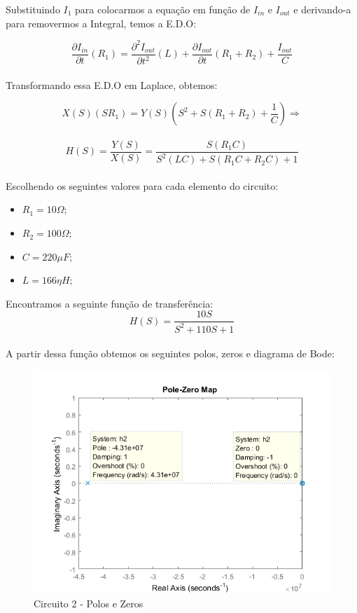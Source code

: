 \documentclass[a4paper, 12pt]{article}
\begin{document}
			Substituindo $I_{1}$ para colocarmos a equação em função de $I_{in}$ e $I_{out}$ e derivando-a para removermos a Integral, temos a E.D.O:
			
			\[	
				\frac{\partial I_{in}}{\partial t}\left(R_{1}\right) = \frac{\partial^{2}I_{out}}{\partial t^{2}}\left(L\right) + \frac{\partial I_{out}}{\partial t}\left(R_{1} + R_{2}\right) + \frac{I_{out}}{C}
			\] 	\\
						
			Transformando essa E.D.O em Laplace, obtemos:
			
			\[	
				X(S)\left(SR_{1}\right) = Y(S)\left(S^{2} + S\left(R_{1} +  R_{2}\right) + \frac{1}{C}\right) \Rightarrow
			\] 	\\			
			\[
			H(S) = \frac{Y(S)}{X(S)} = \frac{S\left(R_{1}C\right)}{S^{2}\left(LC\right) + S\left(R_{1}C + R_{2}C\right) + 1}
			\] 	\\					
			
			Escolhendo os seguintes valores para cada elemento do circuito:
			\begin{itemize}
				\item $R_{1} = 10\Omega;$
				\item $R_{2} = 100\Omega;$
				\item $C = 220\mu F;$
				\item $L = 166\eta H;$
			\end{itemize}	
							
			Encontramos a seguinte função de transferência:
			\[
				H(S) = \frac{10S}{S^{2} + 110S + 1}
			\] 	\\				
			A partir dessa função obtemos os seguintes polos, zeros e diagrama de Bode:
			\begin{figure}[!ht]
				\centering
				\includegraphics[scale=0.8]{img/1e_circ2.png}
				\caption{Circuito 2 - Polos e Zeros}	
			\end{figure}	
\end{document}
